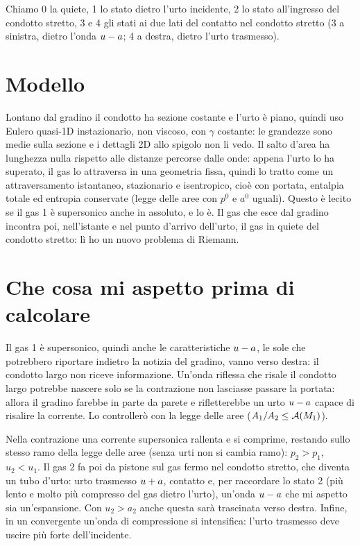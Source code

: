 Chiamo 0 la quiete, 1 lo stato dietro l'urto incidente, 2 lo stato all'ingresso del condotto stretto, 3 e 4 gli stati
ai due lati del contatto nel condotto stretto (3 a sinistra, dietro l'onda $u-a$; 4 a destra, dietro l'urto
trasmesso).

\section*{Modello}
Lontano dal gradino il condotto ha sezione costante e l'urto è piano, quindi uso Eulero quasi-1D instazionario, non
viscoso, con $\gamma$ costante: le grandezze sono medie sulla sezione e i dettagli 2D allo spigolo non li vedo.
Il salto d'area ha lunghezza nulla rispetto alle distanze percorse dalle onde: appena l'urto lo ha superato, il gas
lo attraversa in una geometria fissa, quindi lo tratto come un attraversamento istantaneo, stazionario e
isentropico, cioè con portata, entalpia totale ed entropia conservate (legge delle aree con $p^0$ e $a^0$ uguali).
Questo è lecito se il gas 1 è supersonico anche in assoluto, e lo è. Il gas che esce dal gradino incontra poi,
nell'istante e nel punto d'arrivo dell'urto, il gas in quiete del condotto stretto: lì ho un nuovo problema di
Riemann.

\section*{Che cosa mi aspetto prima di calcolare}
Il gas 1 è supersonico, quindi anche le caratteristiche $u-a$, le sole che potrebbero riportare indietro la notizia
del gradino, vanno verso destra: il condotto largo non riceve informazione. Un'onda riflessa che risale il
condotto largo potrebbe nascere solo se la contrazione non lasciasse passare la portata: allora il gradino
farebbe in parte da parete e rifletterebbe un urto $u-a$ capace di risalire la corrente. Lo controllerò con la legge
delle aree ($A_1/A_2\le\mathcal{A}(M_1)$).

Nella contrazione una corrente supersonica rallenta e si comprime, restando sullo stesso ramo della legge delle aree
(senza urti non si cambia ramo): $p_2>p_1$, $u_2<u_1$. Il gas 2 fa poi da pistone sul gas fermo nel condotto
stretto, che diventa un tubo d'urto: urto trasmesso $u+a$, contatto e, per raccordare lo stato 2 (più lento e molto
più compresso del gas dietro l'urto), un'onda $u-a$ che mi aspetto sia un'espansione. Con $u_2>a_2$ anche questa
sarà trascinata verso destra. Infine, in un convergente un'onda di compressione si intensifica: l'urto trasmesso
deve uscire più forte dell'incidente.

